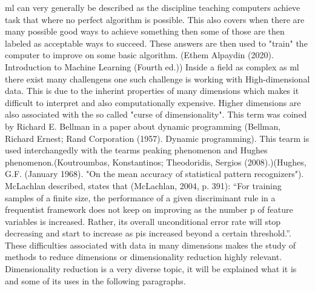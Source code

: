 \gls{ml} can very generally be described as the discipline teaching computers achieve task that where no perfect algorithm is possible. This also covers when there are many possible good ways to achieve something then some of those are then labeled as acceptable ways to succeed. These answers are then used to "train" the computer to improve on some basic algorithm. (Ethem Alpaydin (2020). Introduction to Machine Learning (Fourth ed.)) Inside a field as complex as \gls{ml} there exist many challengens one such challenge is working with High-dimensional data. This is due to the inherint properties of many dimensions which makes it difficult to interpret and also computationally expensive. Higher dimensions are also associated with the so called "curse of dimensionality". This term was coined by Richard E. Bellman in a paper about dynamic programming (Bellman, Richard Ernest; Rand Corporation (1957). Dynamic programming). This tearm is used interchangedly with the tearms peaking phenomenon and Hughes phenomenon.(Koutroumbas, Konstantinos; Theodoridis, Sergios (2008).)(Hughes, G.F. (January 1968). "On the mean accuracy of statistical pattern recognizers"). McLachlan described, states that (McLachlan, 2004, p. 391): 
“For training samples of a ﬁnite size, the performance of a given discriminant
rule in a frequentist framework does not keep on improving as the number p
of feature variables is increased. Rather, its overall unconditional error rate
will stop decreasing and start to increase as pis increased beyond a certain
threshold.”.
These difficulties associated with data in many dimensions makes the study of methods to reduce dimensions or dimensionality reduction highly relevant. Dimensionality reduction is a very diverse topic, it will be  explained what it is and some of its uses in the following paragraphs.





